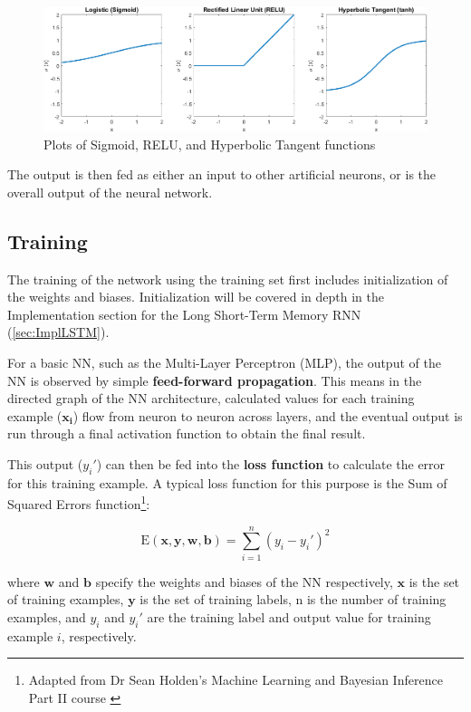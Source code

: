 \documentclass[12pt,a4paper,twoside,openright]{report}
\renewcommand{\vec}[1]{\mathbf{#1}}
\begin{document}
\begin{figure}[h]
\includegraphics[width=\textwidth]{ActivationFunsCrop.png}
\caption{Plots of Sigmoid, RELU, and Hyperbolic Tangent functions}
\end{figure}

The output is then fed as either an input to other artificial neurons, or is the overall
output of the neural network.

\subsection{Training}
\label{sec:introTrain}

The training of the network using the training set first includes initialization of the 
weights and biases. Initialization will be covered in depth in the Implementation section
for the Long Short-Term Memory RNN (\cref{sec:ImplLSTM}).

For a basic NN, such as the Multi-Layer Perceptron (MLP), the output of the NN is
observed by simple \textbf{feed-forward propagation}. This means in the directed graph
of the NN architecture, calculated values for each training example ($\vec{x_i}$)
flow from neuron to neuron across layers, and the eventual
output is run through a final activation function to obtain the final result.

This output ($y_i'$) can then be fed into the \textbf{loss function} to calculate the error for this
training example. A typical loss function for this purpose is the Sum of Squared Errors 
function\footnote{Adapted from Dr Sean Holden's Machine Learning and Bayesian Inference Part II course \cite{Holden18}}:

\begin{equation}
\text{E}(\vec{x}, \vec{y}, \vec{w}, \vec{b})  = \sum_{i=1}^{n} (y_i - y_i')^2
\end{equation}

where $\vec{w}$ and $\vec{b}$ specify the weights and biases of the NN respectively, 
$\vec{x}$ is the set of training examples,
$\vec{y}$ is the set of training labels, n is the number of training examples, and $y_i$ and $y_i'$
are the training label and output value for training example $i$, respectively.
\end{document}
